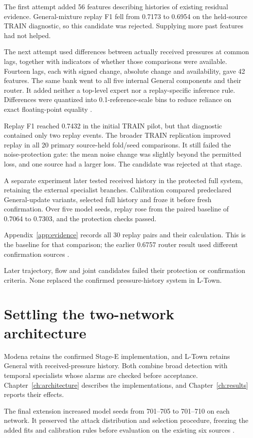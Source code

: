 The first attempt added 56 features describing histories of existing residual evidence. General-mixture replay F1 fell from 0.7173 to 0.6954 on the held-source TRAIN diagnostic, so this candidate was rejected. Supplying more past features had not helped.

The next attempt used differences between actually received pressures at common lags, together with indicators of whether those comparisons were available. Fourteen lags, each with signed change, absolute change and availability, gave 42 features. The same bank went to all five internal General components and their router. It added neither a top-level expert nor a replay-specific inference rule. Differences were quantized into 0.1-reference-scale bins to reduce reliance on exact floating-point equality \cite{projecthistory}.

Replay F1 reached 0.7432 in the initial TRAIN pilot, but that diagnostic contained only two replay events. The broader TRAIN replication improved replay in all 20 primary source-held fold/seed comparisons. It still failed the noise-protection gate: the mean noise change was slightly beyond the permitted loss, and one source had a larger loss. The candidate was rejected at that stage.

A separate experiment later tested received history in the protected full system, retaining the external specialist branches. Calibration compared predeclared General-update variants, selected full history and froze it before fresh confirmation. Over five model seeds, replay rose from the paired baseline of 0.7064 to 0.7303, and the protection checks passed.

Appendix~\ref{app:evidence} records all 30 replay pairs and their calculation. This is the baseline for that comparison; the earlier 0.6757 router result used different confirmation sources \cite{projecthistory}.

Later trajectory, flow and joint candidates failed their protection or confirmation criteria. None replaced the confirmed pressure-history system in L-Town.

\section{Settling the two-network architecture}
Modena retains the confirmed Stage-E implementation, and L-Town retains General with received-pressure history. Both combine broad detection with temporal specialists whose alarms are checked before acceptance. Chapter~\ref{ch:architecture} describes the implementations, and Chapter~\ref{ch:results} reports their effects.

The final extension increased model seeds from 701--705 to 701--710 on each network. It preserved the attack distribution and selection procedure, freezing the added fits and calibration rules before evaluation on the existing six sources \cite{projectfinal}.
